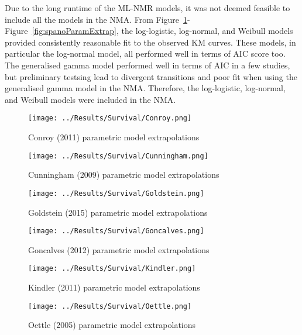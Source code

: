 Due to the long runtime of the ML-NMR models, it was not deemed feasible to include all the models in the NMA. From Figure~\ref{fig:conroyParamExtrap}-Figure~\ref{fig:spanoParamExtrap}, the log-logistic, log-normal, and Weibull models provided consistently reasonable fit to the observed KM curves. These models, in particular the log-normal model, all performed well in terms of AIC score too. The generalised gamma model performed well in terms of AIC in a few studies, but preliminary testsing lead to divergent transitions and poor fit when using the generalised gamma model in the NMA. Therefore, the log-logistic, log-normal, and Weibull models were included in the NMA.

\begin{figure}[h]
    \centering
    \texttt{[image: ../Results/Survival/Conroy.png]}
    \caption{Conroy (2011) parametric model extrapolations}
    \label{fig:conroyParamExtrap}
\end{figure}

\begin{figure}[h]
    \centering
    \texttt{[image: ../Results/Survival/Cunningham.png]}
    \caption{Cunningham (2009) parametric model extrapolations}
    \label{fig:cunninghamParamExtrap}
\end{figure}

\begin{figure}[h]
    \centering
    \texttt{[image: ../Results/Survival/Goldstein.png]}
    \caption{Goldstein (2015) parametric model extrapolations}
    \label{fig:goldsteinParamExtrap}
\end{figure}

\begin{figure}[h]
    \centering
    \texttt{[image: ../Results/Survival/Goncalves.png]}
    \caption{Goncalves (2012) parametric model extrapolations}
    \label{fig:goncalvesParamExtrap}
\end{figure}

\begin{figure}[h]
    \centering
    \texttt{[image: ../Results/Survival/Kindler.png]}
    \caption{Kindler (2011) parametric model extrapolations}
    \label{fig:kindlerParamExtrap}
\end{figure}

\begin{figure}[h]
    \centering
    \texttt{[image: ../Results/Survival/Oettle.png]}
    \caption{Oettle (2005) parametric model extrapolations}
    \label{fig:oettleParamExtrap}
\end{figure}

